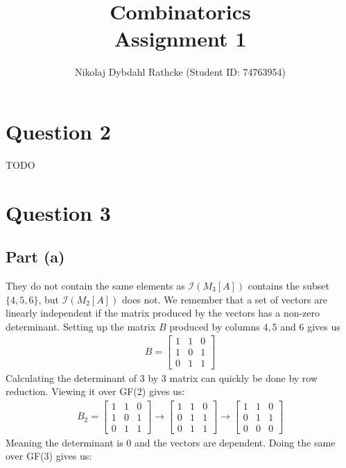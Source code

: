 \documentclass[a4paper, fleqn]{article}
\author{Nikolaj Dybdahl Rathcke (Student ID: 74763954)}
\title{Combinatorics \\ Assignment 1}
\begin{document}
\maketitle

\section*{Question 2}
TODO

\section*{Question 3}

\subsection*{Part (a)}
They do not contain the same elements as $\mathcal{I}(M_3[A])$ contains the subset $\{4,5,6\}$, but $\mathcal{I}(M_2[A])$ does not. We remember that a set of vectors are linearly independent if the matrix produced by the vectors has a non-zero determinant. Setting up the matrix $B$ produced by columns $4,5$ and $6$ gives us
\begin{align*}
  B = \begin{bmatrix}
  1 & 1 & 0 \\
  1 & 0 & 1 \\
  0 & 1 & 1
  \end{bmatrix}
\end{align*}
Calculating the determinant of $3$ by $3$ matrix can quickly be done by row reduction. Viewing it over GF(2) gives us:
\begin{align*}
    B_2 = \begin{bmatrix}
    1 & 1 & 0 \\
    1 & 0 & 1 \\
    0 & 1 & 1
    \end{bmatrix}
    \rightarrow
    \begin{bmatrix}
    1 & 1 & 0 \\
    0 & 1 & 1 \\
    0 & 1 & 1
    \end{bmatrix}
    \rightarrow
    \begin{bmatrix}
    1 & 1 & 0 \\
    0 & 1 & 1 \\
    0 & 0 & 0
    \end{bmatrix}
\end{align*}
Meaning the determinant is $0$ and the vectors are dependent. Doing the same over GF(3) gives us:
\end{document}
